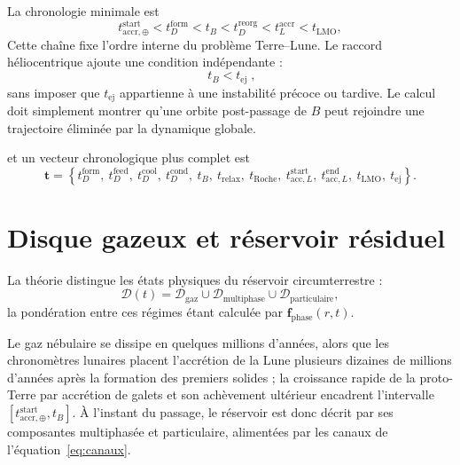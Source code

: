 \documentclass[11pt,a4paper,openany]{report}
\begin{document}
La chronologie minimale est
\begin{equation}
t^{\mathrm{start}}_{\mathrm{accr},\oplus}<t^{\mathrm{form}}_D<t_B<t^{\mathrm{reorg}}_D
<t^{\mathrm{accr}}_L<t_{\mathrm{LMO}},
\label{eq:ordre}
\end{equation}
Cette chaîne fixe l'ordre interne du problème Terre--Lune. Le raccord héliocentrique ajoute une
condition indépendante :
\begin{equation}
\boxed{\;t_B<t_{\mathrm{ej}}\;},
\label{eq:ordreB}
\end{equation}
sans imposer que $t_{\mathrm{ej}}$ appartienne à une instabilité précoce ou tardive. Le calcul doit
simplement montrer qu'une orbite post-passage de $B$ peut rejoindre une trajectoire éliminée par
la dynamique globale.

et un vecteur chronologique plus complet est
\begin{equation}
\mathbf{t}=\left\{t^{\mathrm{form}}_D,\ t^{\mathrm{feed}}_D,\ t^{\mathrm{cool}}_D,\
t^{\mathrm{cond}}_D,\ t_B,\ t_{\mathrm{relax}},\ t_{\mathrm{Roche}},\
t^{\mathrm{start}}_{\mathrm{acc},L},\ t^{\mathrm{end}}_{\mathrm{acc},L},\ t_{\mathrm{LMO}},\ t_{\mathrm{ej}}\right\}.
\label{eq:vecteur-t}
\end{equation}

\section{Disque gazeux et réservoir résiduel}

La théorie distingue les états physiques du réservoir circumterrestre :
\begin{equation}
\mathcal{D}(t)=\mathcal{D}_{\mathrm{gaz}}\cup\mathcal{D}_{\mathrm{multiphase}}\cup
\mathcal{D}_{\mathrm{particulaire}},
\label{eq:etats}
\end{equation}
la pondération entre ces régimes étant calculée par $\mathbf{f}_{\mathrm{phase}}(r,t)$.

Le gaz nébulaire se dissipe en quelques millions d'années, alors que les chronomètres lunaires
placent l'accrétion de la Lune plusieurs dizaines de millions d'années après la formation des
premiers solides ; la croissance rapide de la proto-Terre par accrétion de galets
\cite{Johansen2021} et son achèvement ultérieur encadrent l'intervalle
$[t^{\mathrm{start}}_{\mathrm{accr},\oplus},t_B]$. À l'instant du passage, le réservoir est donc
décrit par ses composantes multiphasée et particulaire, alimentées par les canaux de
l'équation~\eqref{eq:canaux}.
\end{document}
